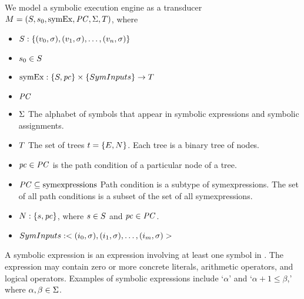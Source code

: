 We model a symbolic execution engine as a transducer $M =
(S, s_0, \mathrm{symEx}, \mathit{PC}, \Sigma,
T)$, where
\begin{itemize}
\item $S: \{(v_0,\sigma), (v_1,\sigma), \ldots, (v_n,\sigma)\}$
\item $s_0 \in S$
\item {} $\mathrm{symEx}: \{S,\mathit{pc}\}
  \times \{SymInputs\} \rightarrow T$
\item $\mathit{PC}$
\item $\Sigma$ The alphabet of symbols that appear in symbolic expressions
  and symbolic assignments.
\item $T$ The set of trees $t = \{E,N\}$. Each tree is a binary tree of nodes.
\end{itemize}

\begin{itemize}
\item $\mathit{pc} \in \mathit{PC}$ is the path condition of a particular node of a tree.
\item $\mathit{PC} \subseteq \mathrm{symexpressions}$ Path condition is a subtype of
  symexpressions. The set of all path conditions is a subset of the set of all
  symexpressions.
\item $N: \{s,\mathit{pc}\}$, where $s \in S$
  and $\mathit{pc} \in \mathit{PC}$.
\item $SymInputs: <(i_0, \sigma), (i_1,
  \sigma), \ldots, (i_m, \sigma)>$
\end{itemize}

A symbolic expression \symexpression{} is an expression involving at least one
symbol in \symalphabet. The expression may contain zero or more concrete
literals, arithmetic operators, and logical operators.  Examples of
symbolic expressions include `$\alpha$' and `$\alpha + 1 \le \beta$,' where $\alpha,
\beta \in \Sigma$.


